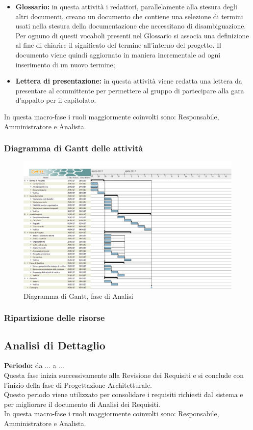 \begin{itemize}
		\item \textbf{Glossario:} in questa attività i redattori, parallelamente alla stesura degli altri documenti, creano un documento che contiene una selezione di termini usati nella stesura della documentazione che necessitano di disambiguazione. Per ognuno di questi vocaboli presenti nel Glossario si associa una definizione al fine di chiarire il significato del termine all'interno del progetto. Il documento viene quindi aggiornato in maniera incrementale ad ogni inserimento di un nuovo termine; \\
		\item \textbf{Lettera di presentazione:} in questa attività viene redatta una lettera da presentare al committente per permettere al gruppo di partecipare alla gara d'appalto per il capitolato. \\
	\end{itemize}
	In questa macro-fase i ruoli maggiormente coinvolti sono: Responsabile, Amministratore e Analista.
	\subsubsection{Diagramma di Gantt delle attività}
	\begin{figure}[H]
		\centering
		\includegraphics[scale=0.30]{immagini/gantt/analisi.png}
		\caption{Diagramma di Gantt, fase di Analisi}
	\end{figure}
	\subsubsection{Ripartizione delle risorse}
	\subsection{Analisi di Dettaglio}
	\textbf{Periodo:} da ... a ... \\
	Questa fase inizia successivamente alla Revisione dei Requisiti e si conclude con l'inizio della fase di Progettazione Architetturale. \\
	Questo periodo viene utilizzato per consolidare i requisiti richiesti dal sistema e per
migliorare il documento di Analisi dei Requisiti. \\
	In questa macro-fase i ruoli maggiormente coinvolti sono: Responsabile, Amministratore e Analista.
